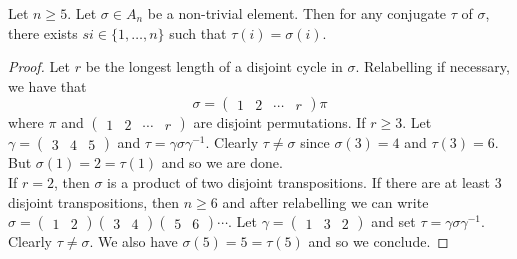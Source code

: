 \documentclass[a4paper]{article}
\begin{document}
\begin{lmm}{}{} Let $n\geq 5$. Let $\sigma\in A_n$ be a non-trivial element. Then for any conjugate $\tau$ of $\sigma$, there exists $si\in\{1,\dots,n\}$ such that $\tau(i)=\sigma(i)$. 
\begin{proof}
Let $r$ be the longest length of a disjoint cycle in $\sigma$. Relabelling if necessary, we have that $$\sigma=\begin{pmatrix}1 & 2 & \cdots & r\end{pmatrix}\pi$$ where $\pi$ and $\begin{pmatrix}1 & 2 & \cdots & r\end{pmatrix}$ are disjoint permutations. If $r\geq 3$. Let $\gamma=\begin{pmatrix}3  & 4 & 5\end{pmatrix}$ and $\tau=\gamma\sigma\gamma^{-1}$. Clearly $\tau\neq\sigma$ since $\sigma(3)=4$ and $\tau(3)=6$. But $\sigma(1)=2=\tau(1)$ and so we are done. \\

If $r=2$, then $\sigma$ is a product of two disjoint transpositions. If there are at least $3$ disjoint transpositions, then $n\geq 6$ and after relabelling we can write $\sigma=\begin{pmatrix}1 & 2 \end{pmatrix}\begin{pmatrix}3 & 4 \end{pmatrix}\begin{pmatrix}5 & 6 \end{pmatrix}\cdots$. Let $\gamma=\begin{pmatrix}1 & 3 & 2 \end{pmatrix}$ and set $\tau=\gamma\sigma\gamma^{-1}$. Clearly $\tau\neq\sigma$. We also have $\sigma(5)=5=\tau(5)$ and so we conclude. 
\end{proof}
\end{lmm}
\end{document}
